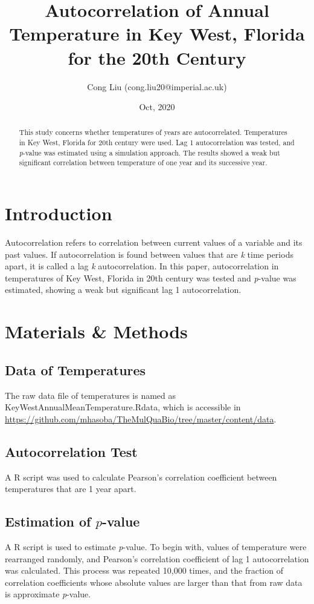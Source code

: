 \documentclass[12pt]{article}
\title{Autocorrelation of Annual Temperature in Key West, Florida for the 20th Century}
\author{Cong Liu (cong.liu20@imperial.ac.uk)}
\date{Oct, 2020}
\begin{document}
  \maketitle

  \begin{abstract}
    This study concerns whether temperatures of years are autocorrelated. Temperatures
    in Key West, Florida for 20th century were used. Lag 1 autocorrelation was tested, and 
    \textit{p}-value was estimated using a simulation approach. The results showed a weak but significant
    correlation between temperature of one year and its successive year. 
    
  \end{abstract}
  
  \section{Introduction}
  Autocorrelation refers to correlation between current values of a variable and its past values.
  If autocorrelation is found between values that are \textit{k} time periods apart, it is called
  a lag \textit{k} autocorrelation. In this paper, autocorrelation in temperatures of Key West, 
  Florida in 20th century was tested and \textit{p}-value was estimated, showing a weak but significant
  lag 1 autocorrelation.
  
  \section{Materials \& Methods}
   
    \subsection{Data of Temperatures}
    The raw data file of temperatures is named as KeyWestAnnualMeanTemperature.Rdata, 
    which is accessible in 
    \newline
    \href{https://github.com/mhasoba/TheMulQuaBio/tree/master/content/data}{https://github.com/mhasoba/TheMulQuaBio/tree/master/content/data}.
    
    \subsection{Autocorrelation Test}
    A R script was used to calculate Pearson's correlation coefficient between temperatures that
    are 1 year apart.
    
    \subsection{Estimation of \texorpdfstring{$\mathit{p}$}{}-value}
    A R script is used to estimate \textit{p}-value. To begin with, values of temperature were
    rearranged randomly, and Pearson's correlation coefficient of lag 1 autocorrelation was calculated.
    This process was repeated 10,000 times, and the fraction of correlation coefficients whose absolute 
    values are larger than that from raw data is approximate \textit{p}-value.
  
\end{document}
